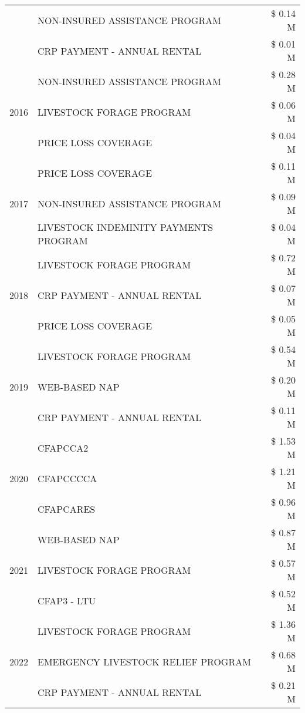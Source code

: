 \begin{tabular}{llr}
 & NON-INSURED ASSISTANCE PROGRAM & \$ 0.14 M \\
 & CRP PAYMENT - ANNUAL RENTAL & \$ 0.01 M \\
\cline{1-3}
\multirow[t]{3}{*}{2016} & NON-INSURED ASSISTANCE PROGRAM & \$ 0.28 M \\
 & LIVESTOCK FORAGE PROGRAM & \$ 0.06 M \\
 & PRICE LOSS COVERAGE & \$ 0.04 M \\
\cline{1-3}
\multirow[t]{3}{*}{2017} & PRICE LOSS COVERAGE & \$ 0.11 M \\
 & NON-INSURED ASSISTANCE PROGRAM & \$ 0.09 M \\
 & LIVESTOCK INDEMINITY PAYMENTS PROGRAM & \$ 0.04 M \\
\cline{1-3}
\multirow[t]{3}{*}{2018} & LIVESTOCK FORAGE PROGRAM & \$ 0.72 M \\
 & CRP PAYMENT - ANNUAL RENTAL & \$ 0.07 M \\
 & PRICE LOSS COVERAGE & \$ 0.05 M \\
\cline{1-3}
\multirow[t]{3}{*}{2019} & LIVESTOCK FORAGE PROGRAM & \$ 0.54 M \\
 & WEB-BASED NAP & \$ 0.20 M \\
 & CRP PAYMENT - ANNUAL RENTAL & \$ 0.11 M \\
\cline{1-3}
\multirow[t]{3}{*}{2020} & CFAPCCA2 & \$ 1.53 M \\
 & CFAPCCCCA & \$ 1.21 M \\
 & CFAPCARES & \$ 0.96 M \\
\cline{1-3}
\multirow[t]{3}{*}{2021} & WEB-BASED NAP & \$ 0.87 M \\
 & LIVESTOCK FORAGE PROGRAM & \$ 0.57 M \\
 & CFAP3 - LTU & \$ 0.52 M \\
\cline{1-3}
\multirow[t]{3}{*}{2022} & LIVESTOCK FORAGE PROGRAM & \$ 1.36 M \\
 & EMERGENCY LIVESTOCK RELIEF PROGRAM & \$ 0.68 M \\
 & CRP PAYMENT - ANNUAL RENTAL & \$ 0.21 M \\
\cline{1-3}
\bottomrule
\end{tabular}
